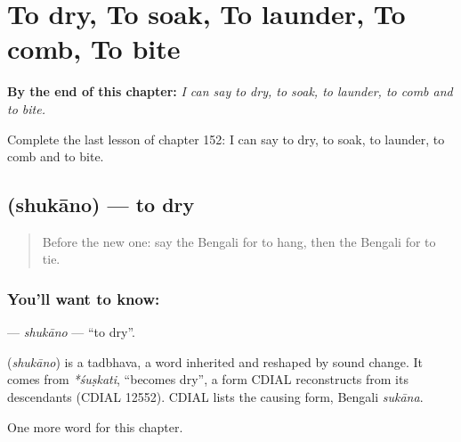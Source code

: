 
\chapter{To dry, To soak, To launder, To comb, To bite}
\label{ch:bn-to-dry-to-soak-to-launder-to-comb-to-bite}

\begin{chapteropening}
\textbf{By the end of this chapter:} \emph{I can say to dry, to soak, to launder, to comb and to bite.}

Complete the last lesson of chapter 152: I can say to dry, to soak, to launder, to comb and to bite.
\end{chapteropening}

\section[\texorpdfstring{\bn{শুকানো} (shukāno)}{শুকানো (shukāno)}]{ (shukāno) — to dry}

\label{lesson:BN-C152-shukano}



\begin{quote}
Before the new one: say the Bengali for to hang, then the Bengali for to tie.
\end{quote}

\subsection*{You'll want to know: }
\textbf{} — \emph{shukāno} — \textquotedblleft{}to dry\textquotedblright{}.

\begin{cousinweb}
\textbf{} (\emph{shukāno}) is a tadbhava, a word inherited and reshaped by sound change. It comes from \emph{*śuṣkati}, \textquotedblleft{}becomes dry\textquotedblright{}, a form CDIAL reconstructs from its descendants (CDIAL 12552). CDIAL lists the causing form, Bengali \emph{sukāna}.
\end{cousinweb}

\begin{grammarlens}[title={What you've built}]
One more word for this chapter.
\end{grammarlens}

